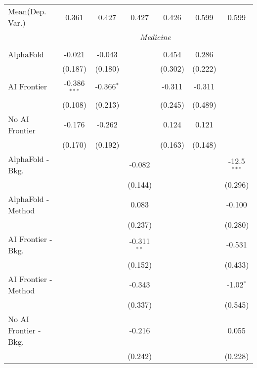 \begin{tabular}{lcccccc}
Mean(Dep. Var.) & 0.361 & 0.427 & 0.427 & 0.426 & 0.599 & 0.599 \\
 & \multicolumn{6}{c}{\textit{Medicine}} \\ \\
   AlphaFold               & -0.021         & -0.043       &               & 0.454   & 0.286   &   \\   
                           & (0.187)        & (0.180)      &               & (0.302) & (0.222) &   \\   
   AI Frontier             & -0.386$^{***}$ & -0.366$^{*}$ &               & -0.311  & -0.311  &   \\   
                           & (0.108)        & (0.213)      &               & (0.245) & (0.489) &   \\   
   No AI Frontier          & -0.176         & -0.262       &               & 0.124   & 0.121   &   \\   
                           & (0.170)        & (0.192)      &               & (0.163) & (0.148) &   \\   
   AlphaFold - Bkg.        &                &              & -0.082        &         &         & -12.5$^{***}$\\   
                           &                &              & (0.144)       &         &         & (0.296)\\   
   AlphaFold - Method      &                &              & 0.083         &         &         & -0.100\\   
                           &                &              & (0.237)       &         &         & (0.280)\\   
   AI Frontier - Bkg.      &                &              & -0.311$^{**}$ &         &         & -0.531\\   
                           &                &              & (0.152)       &         &         & (0.433)\\   
   AI Frontier - Method    &                &              & -0.343        &         &         & -1.02$^{*}$\\   
                           &                &              & (0.337)       &         &         & (0.545)\\   
   No AI Frontier - Bkg.   &                &              & -0.216        &         &         & 0.055\\   
                           &                &              & (0.242)       &         &         & (0.228)\\   

\end{tabular}
